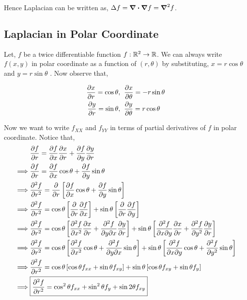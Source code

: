 \documentclass[../Analysis-3]{subfiles}
\begin{document}
Hence Laplacian can be written as, $\Delta f = \div\grad f = \grad ^2 f$.

\subsection*{Laplacian in Polar Coordinate}

Let, $f$ be a twice differentiable function $f: \mathbb{R}^2 \to \mathbb{R}$. We can always write $f(x,y)$ in polar coordinate as a function of $(r,\theta)$ by substituting, $x = r\cos{\theta}$ and $y= r\sin{\theta}$ . Now observe that,

\begin{align*}
        \pdv{x}{r} = \cos{\theta}, \hspace*{0.2cm} & \pdv{x}{\theta} = -r\sin{\theta} \\
        \pdv{y}{r} = \sin{\theta}, \hspace*{0.2cm} & \pdv{y}{\theta} = r\cos{\theta}
\end{align*}

Now we want to write $f_{XX}$ and $f_{YY}$ in terms of partial derivatives of $f$ in polar coordinate. Notice that,
\begin{align*}
    & \pdv{f}{r} = \pdv{f}{x} \pdv{x}{r} + \pdv{f}{y}\pdv{y}{r}                                                                                                                               \\
    \implies   & \pdv{f}{r} = \pdv{f}{x} \cos{\theta} + \pdv{f}{y}\sin{\theta}                                                                                                                           \\
    \implies   & \pdv[2]{f}{r} = \pdv{}{r} \left[\pdv{f}{x} \cos{\theta} + \pdv{f}{y} \sin{\theta} \right]                                                                                               \\
    \implies   & \pdv[2]{f}{r} = \cos{\theta} \left[\pdv{}{r} \pdv{f}{x}\right] + \sin{\theta} \left[\pdv{}{r} \pdv{f}{y} \right]                                                                        \\
    \implies   & \pdv[2]{f}{r} = \cos{\theta} \left[\pdv[2]{f}{x} \pdv{x}{r} + \pdv{f}{y}{x} \pdv{y}{r} \right] + \sin{\theta} \left[\pdv{f}{x}{y} \pdv{x}{r} + \pdv[2]{f}{y} \pdv{y}{r} \right]         \\
    \implies   & \pdv[2]{f}{r} = \cos{\theta} \left[\pdv[2]{f}{x} \cos{\theta} + \pdv{f}{y}{x} \sin{\theta} \right] + \sin{\theta} \left[\pdv{f}{x}{y} \cos{\theta} + \pdv[2]{f}{y} \sin{\theta} \right] \\
    \implies   & \pdv[2]{f}{r} = \cos{\theta} \left[\cos{\theta} f_{xx} + \sin{\theta} f_{xy} \right] + \sin{\theta} \left[\cos{\theta} f_{xy} + \sin{\theta} f_{y} \right]                              \\
    \implies   & \boxed{\pdv[2]{f}{r} = \cos^2 \theta f_{xx} + \sin^2 \theta f_{y} + \sin 2 \theta f_{xy}}
\end{align*}
\end{document}
